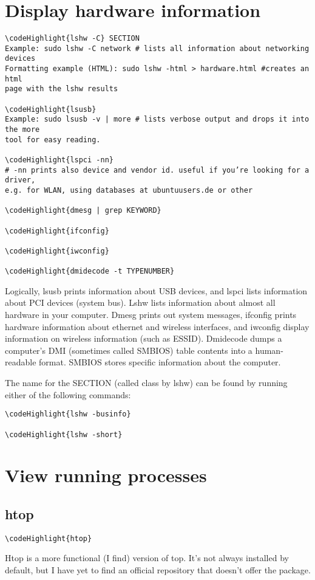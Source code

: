 \documentclass[12pt,a4paper]{article}
\begin{document}
\section{Display hardware information}
\label{Display hardware information}
\begin{Verbatim}[commandchars=\\\{\}]
\codeHighlight{lshw -C} SECTION
Example: sudo lshw -C network # lists all information about networking devices
Formatting example (HTML): sudo lshw -html > hardware.html #creates an html 
page with the lshw results

\codeHighlight{lsusb}
Example: sudo lsusb -v | more # lists verbose output and drops it into the more 
tool for easy reading.

\codeHighlight{lspci -nn}
# -nn prints also device and vendor id. useful if you’re looking for a driver, 
e.g. for WLAN, using databases at ubuntuusers.de or other

\codeHighlight{dmesg | grep KEYWORD}

\codeHighlight{ifconfig}

\codeHighlight{iwconfig}

\codeHighlight{dmidecode -t TYPENUMBER}
\end{Verbatim}
Logically, lsusb prints information about USB devices, and lspci lists information about PCI devices (system bus).  Lshw lists information about almost all hardware in your computer.  Dmesg prints out system messages, ifconfig prints hardware information about ethernet and wireless interfaces, and iwconfig display information on wireless information (such as ESSID).  Dmidecode dumps a computer's DMI (sometimes called SMBIOS) table contents into a human-readable format.  SMBIOS stores specific information about the computer.

The name for the SECTION (called class by lshw) can be found by running either of the following commands:
\begin{Verbatim}[commandchars=\\\{\}]
\codeHighlight{lshw -businfo}

\codeHighlight{lshw -short}
\end{Verbatim}

\section{View running processes}
\label{View running processes}
\subsection{htop}
\begin{Verbatim}[commandchars=\\\{\}]
\codeHighlight{htop}
\end{Verbatim}
Htop is a more functional (I find) version of top.  It's not always installed by default, but I have yet to find an official repository that doesn't offer the package.
\end{document}
